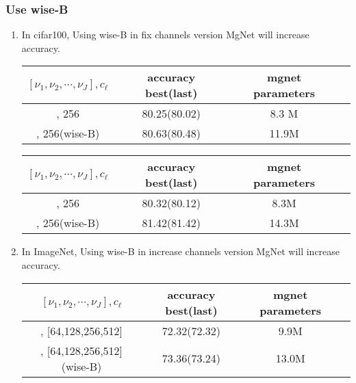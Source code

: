 \subsubsection{Use wise-B}
\begin{enumerate}
\item In cifar100, Using wise-B in fix channels version MgNet will increase accuracy.
\begin{table}[!htbp]
	\begin{center}
			\begin{tabular}{|c|c|c|c|}
                \hline
				$[\nu_1,\nu_2,\cdots,\nu_J], c_\ell$   &  accuracy best(last)  & mgnet parameters \tabularnewline
				\hline
				[4,2,2,2], 256                         &  80.25(80.02)         &     8.3 M        \tabularnewline
				\hline		
				[4,2,2,2], 256(wise-B)                 &  80.63(80.48)         &     11.9M        \tabularnewline
				\hline
			\end{tabular}
	\end{center}
\end{table}

\begin{table}[!htbp]
	\begin{center}
			\begin{tabular}{|c|c|c|c|}
                \hline
				$[\nu_1,\nu_2,\cdots,\nu_J], c_\ell$   &  accuracy best(last)  & mgnet parameters \tabularnewline
				\hline
				[8,2,2,2], 256                         &  80.32(80.12)         &     8.3M         \tabularnewline
				\hline		
				[8,2,2,2], 256(wise-B)                 &  81.42(81.42)         &     14.3M        \tabularnewline
				\hline
			\end{tabular}
	\end{center}
\end{table}

\item In ImageNet, Using wise-B in increase channels version MgNet will increase accuracy.
\begin{table}[!htbp]
	\begin{center}
			\begin{tabular}{|c|c|c|c|}
                \hline
				$[\nu_1,\nu_2,\cdots,\nu_J], c_\ell$   &  accuracy best(last)  & mgnet parameters \tabularnewline
				\hline
				[2,2,2,2], [64,128,256,512]            &  72.32(72.32)         &     9.9M         \tabularnewline
				\hline		
				[2,2,2,2], [64,128,256,512](wise-B)    &  73.36(73.24)         &     13.0M        \tabularnewline
				\hline
			\end{tabular}
	\end{center}
\end{table}


\end{enumerate}
